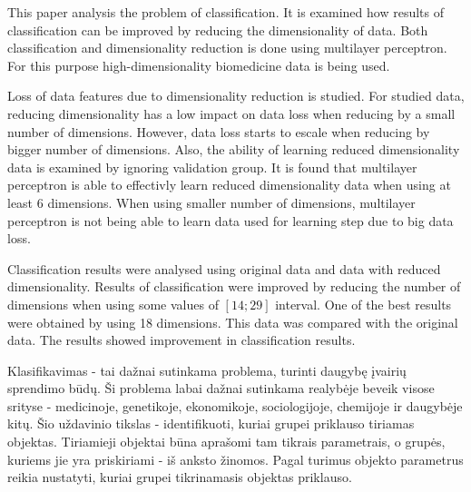 \documentclass{VUMIFPSbakalaurinis}
\begin{document}
This paper analysis the problem of classification.
It is examined how results of classification can be improved by reducing the dimensionality of data.
Both classification and dimensionality reduction is done using multilayer perceptron.
For this purpose high-dimensionality biomedicine data is being used.

Loss of data features due to dimensionality reduction is studied.
For studied data, reducing dimensionality has a low impact on data loss when reducing by a small number of dimensions.
However, data loss starts to escale when reducing by bigger number of dimensions.
Also, the ability of learning reduced dimensionality data is examined by ignoring validation group.
It is found that multilayer perceptron is able to effectivly learn reduced dimensionality data when using at least 6 dimensions.
When using smaller number of dimensions, multilayer perceptron is not being able to learn data used for learning step due to big data loss.

Classification results were analysed using original data and data with reduced dimensionality.
Results of classification were improved by reducing the number of dimensions when using some values of $[14; 29]$ interval.
One of the best results were obtained by using 18 dimensions.
This data was compared with the original data.
The results showed improvement in classification results.




\tableofcontents









Klasifikavimas - tai dažnai sutinkama problema, turinti daugybę įvairių sprendimo būdų.
Ši problema labai dažnai sutinkama realybėje beveik visose srityse - medicinoje, genetikoje, ekonomikoje, sociologijoje, chemijoje ir daugybėje kitų.
Šio uždavinio tikslas - identifikuoti, kuriai grupei priklauso tiriamas objektas.
Tiriamieji objektai būna aprašomi tam tikrais parametrais, o grupės, kuriems jie yra priskiriami - iš anksto žinomos.
Pagal turimus objekto parametrus reikia nustatyti, kuriai grupei tikrinamasis objektas priklauso.
\end{document}
